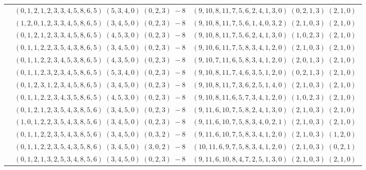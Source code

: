 \documentclass[11pt]{article}
\begin{document}
\begin{longtable}[l]{|c|c|c|}
 \cline{2-3} 
 & $(0 ,1 ,2 ,1 ,2 ,3 ,3 ,4 ,5 ,8 ,6 ,5) \;(5 ,3 ,4 ,0) \;(0 ,2 ,3) \;-8$ & $(9 ,10 ,8 ,11 ,7 ,5 ,6 ,2 ,4 ,1 ,3 ,0) \;(0 ,2 ,1 ,3) \;(2 ,1 ,0) \;$\\ 
 \cline{2-3} 
 & $(1 ,2 ,0 ,1 ,2 ,3 ,3 ,4 ,5 ,8 ,6 ,5) \;(3 ,4 ,5 ,0) \;(0 ,2 ,3) \;-8$ & $(9 ,10 ,8 ,11 ,7 ,5 ,6 ,1 ,4 ,0 ,3 ,2) \;(2 ,1 ,0 ,3) \;(2 ,1 ,0) \;$\\ 
 \cline{2-3} 
 & $(0 ,1 ,2 ,1 ,2 ,3 ,3 ,4 ,5 ,8 ,6 ,5) \;(4 ,5 ,3 ,0) \;(0 ,2 ,3) \;-8$ & $(9 ,10 ,8 ,11 ,7 ,5 ,6 ,2 ,4 ,1 ,3 ,0) \;(1 ,0 ,2 ,3) \;(2 ,1 ,0) \;$\\ 
 \cline{2-3} 
 & $(0 ,1 ,1 ,2 ,2 ,3 ,5 ,4 ,3 ,8 ,6 ,5) \;(3 ,4 ,5 ,0) \;(0 ,2 ,3) \;-8$ & $(9 ,10 ,6 ,11 ,7 ,5 ,8 ,3 ,4 ,1 ,2 ,0) \;(2 ,1 ,0 ,3) \;(2 ,1 ,0) \;$\\ 
 \cline{2-3} 
 & $(0 ,1 ,1 ,2 ,2 ,3 ,4 ,5 ,3 ,8 ,6 ,5) \;(4 ,3 ,5 ,0) \;(0 ,2 ,3) \;-8$ & $(9 ,10 ,7 ,11 ,6 ,5 ,8 ,3 ,4 ,1 ,2 ,0) \;(2 ,0 ,1 ,3) \;(2 ,1 ,0) \;$\\ 
 \cline{2-3} 
 & $(0 ,1 ,1 ,2 ,3 ,2 ,3 ,4 ,5 ,8 ,6 ,5) \;(5 ,3 ,4 ,0) \;(0 ,2 ,3) \;-8$ & $(9 ,10 ,8 ,11 ,7 ,4 ,6 ,3 ,5 ,1 ,2 ,0) \;(0 ,2 ,1 ,3) \;(2 ,1 ,0) \;$\\ 
 \cline{2-3} 
 & $(0 ,1 ,2 ,3 ,1 ,2 ,3 ,4 ,5 ,8 ,6 ,5) \;(3 ,4 ,5 ,0) \;(0 ,2 ,3) \;-8$ & $(9 ,10 ,8 ,11 ,7 ,3 ,6 ,2 ,5 ,1 ,4 ,0) \;(2 ,1 ,0 ,3) \;(2 ,1 ,0) \;$\\ 
 \cline{2-3} 
 & $(0 ,1 ,1 ,2 ,2 ,3 ,4 ,3 ,5 ,8 ,6 ,5) \;(4 ,5 ,3 ,0) \;(0 ,2 ,3) \;-8$ & $(9 ,10 ,8 ,11 ,6 ,5 ,7 ,3 ,4 ,1 ,2 ,0) \;(1 ,0 ,2 ,3) \;(2 ,1 ,0) \;$\\ 
 \cline{2-3} 
 & $(0 ,1 ,2 ,1 ,2 ,3 ,5 ,4 ,3 ,8 ,5 ,6) \;(3 ,4 ,5 ,0) \;(0 ,2 ,3) \;-8$ & $(9 ,11 ,6 ,10 ,7 ,5 ,8 ,2 ,4 ,1 ,3 ,0) \;(2 ,1 ,0 ,3) \;(2 ,1 ,0) \;$\\ 
 \cline{2-3} 
 & $(1 ,0 ,1 ,2 ,2 ,3 ,5 ,4 ,3 ,8 ,5 ,6) \;(3 ,4 ,5 ,0) \;(0 ,2 ,3) \;-8$ & $(9 ,11 ,6 ,10 ,7 ,5 ,8 ,3 ,4 ,0 ,2 ,1) \;(2 ,1 ,0 ,3) \;(2 ,1 ,0) \;$\\ 
 \cline{2-3} 
 & $(0 ,1 ,1 ,2 ,2 ,3 ,5 ,4 ,3 ,8 ,5 ,6) \;(3 ,4 ,5 ,0) \;(0 ,3 ,2) \;-8$ & $(9 ,11 ,6 ,10 ,7 ,5 ,8 ,3 ,4 ,1 ,2 ,0) \;(2 ,1 ,0 ,3) \;(1 ,2 ,0) \;$\\ 
 \cline{2-3} 
 & $(0 ,1 ,1 ,2 ,2 ,3 ,5 ,4 ,3 ,5 ,8 ,6) \;(3 ,4 ,5 ,0) \;(3 ,0 ,2) \;-8$ & $(10 ,11 ,6 ,9 ,7 ,5 ,8 ,3 ,4 ,1 ,2 ,0) \;(2 ,1 ,0 ,3) \;(0 ,2 ,1) \;$\\ 
 \cline{2-3} 
 & $(0 ,1 ,2 ,1 ,3 ,2 ,5 ,3 ,4 ,8 ,5 ,6) \;(3 ,4 ,5 ,0) \;(0 ,2 ,3) \;-8$ & $(9 ,11 ,6 ,10 ,8 ,4 ,7 ,2 ,5 ,1 ,3 ,0) \;(2 ,1 ,0 ,3) \;(2 ,1 ,0) \;$\\ 

\end{longtable}
\end{document}
